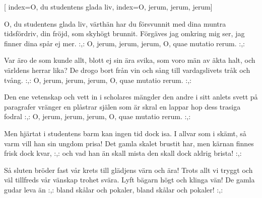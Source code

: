 [
	index={O, du studentens glada liv},
	index={O, jerum, jerum, jerum}]

\beginverse* 
O, du studentens glada liv,
värthän har du försvunnit
med dina muntra tidsfördriv,
din fröjd, som skyhögt brunnit.
Förgäves jag omkring mig ser,
jag finner dina spår ej mer.
:,: O, jerum, jerum, jerum,
O, quae mutatio rerum. :,:
\endverse

\beginverse* 
Var äro de som kunde allt,
blott ej sin ära svika,
som voro män av äkta halt,
och världens herrar lika?
De drogo bort från vin och sång
till vardagslivets tråk och tvång.
:,: O, jerum, jerum, jerum,
O, quae mutatio rerum. :,:
\endverse

\beginverse* 
Den ene vetenskap och vett
in i scholares mängder
den andre i sitt anlets svett
på paragrafer vränger
en plåstrar själen som är skral
en lappar hop dess trasiga fodral 
:,: O, jerum, jerum, jerum,
O, quae mutatio rerum. :,:
\endverse


\beginverse* 
Men hjärtat i studentens barm
kan ingen tid dock isa.
I allvar som i skämt, så varm
vill han sin ungdom prisa!
Det gamla skalet brustit har,
men kärnan finnes frisk dock kvar,
:,: och vad han än skall mista
den skall dock aldrig brista! :,:
\endverse

\beginverse* 
Så sluten bröder fast vår krets
till glädjens värn och ära!
Trots allt vi tryggt och väl tillfreds
vår vänskap trohet svära.
Lyft bägarn högt och klinga vän!
De gamla gudar leva än 
:,: bland skålar och pokaler,
bland skålar och pokaler! :,: 
\endverse
\endsong


